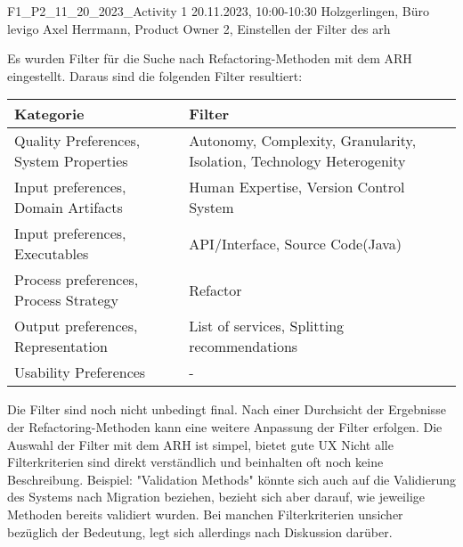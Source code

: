 \fieldnotelong
{F1\_P2\_11\_20\_2023\_Activity}
{1}
{20.11.2023, 10:00-10:30}
{Holzgerlingen, Büro levigo}
{Axel Herrmann, Product Owner}
{2, Einstellen der Filter des \gls{arh}}
{
	Es wurden Filter für die Suche nach Refactoring-Methoden mit dem ARH eingestellt. Daraus sind die folgenden Filter resultiert:
	\begin{tabular}{|p{3.3cm}|p{4cm}|}
		\hline
		\textbf{Kategorie} & \textbf{Filter} \\ \hline
		Quality Preferences, System Properties & Autonomy, Complexity, Granularity, Isolation, Technology Heterogenity \\ \hline
		Input preferences, Domain Artifacts & Human Expertise, Version Control System \\ \hline
		Input preferences, Executables & API/Interface, Source Code(Java) \\ \hline
		Process preferences, Process Strategy & Refactor \\ \hline
		Output preferences, Representation & List of services, Splitting recommendations \\ \hline
		Usability Preferences & - \\ \hline
	\end{tabular}
}
{Die Filter sind noch nicht unbedingt final. Nach einer Durchsicht der Ergebnisse der Refactoring-Methoden kann eine weitere Anpassung der Filter erfolgen.}
{Die Auswahl der Filter mit dem ARH ist simpel, bietet gute UX}
{Nicht alle Filterkriterien sind direkt verständlich und beinhalten oft noch keine Beschreibung. Beispiel: "Validation Methods" könnte sich auch auf die Validierung des Systems nach Migration beziehen, bezieht sich aber darauf, wie jeweilige Methoden bereits validiert wurden.}
{Bei manchen Filterkriterien unsicher bezüglich der Bedeutung, legt sich allerdings nach Diskussion darüber.}